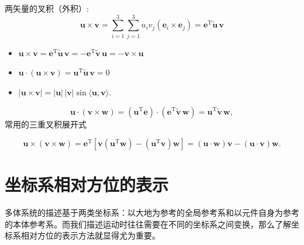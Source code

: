 \begin{definition}[向量的叉积]
	两矢量的叉积（外积）:
	$$
	\boldsymbol{u}\times\boldsymbol{v}
	= \sum_{i=1}^{3}\sum_{j=1}^{3} u_i v_j \left(\mathbf{e}_i\times\mathbf{e}_j\right)
	= \boldsymbol{e}^{\mathrm{T}}\tilde{\boldsymbol{u}}\,\boldsymbol{v}
	$$
\end{definition}

\begin{property}[向量叉积的性质]
	\begin{itemize}
		\item $\boldsymbol{u}\times\boldsymbol{v} = \boldsymbol{e}^{\mathrm{T}}\tilde{\boldsymbol{u}}\,\boldsymbol{v} = -\boldsymbol{e}^{\mathrm{T}}\tilde{\boldsymbol{v}}\,\boldsymbol{u} = -\boldsymbol{v}\times\boldsymbol{u}$
		\item$\boldsymbol{u}\cdot\left(\boldsymbol{u}\times\boldsymbol{v}\right) = \boldsymbol{u}^{\mathrm{T}}\tilde{\boldsymbol{u}}\,\boldsymbol{v} = 0$
		\item $|\boldsymbol{u}\times\boldsymbol{v}| = |\boldsymbol{u}|\,|\boldsymbol{v}|\sin\langle\boldsymbol{u},\boldsymbol{v}\rangle.$
	\end{itemize}
\end{property}

\begin{definition}[三矢量混合积运算]
	$$
	\boldsymbol{u}\cdot\left(\boldsymbol{v}\times\boldsymbol{w}\right)
	= \left(\boldsymbol{u}^{\mathrm{T}}\boldsymbol{e}\right)\cdot\left(\boldsymbol{e}^{\mathrm{T}}\tilde{\boldsymbol{v}}\,\boldsymbol{w}\right)
	= \boldsymbol{u}^{\mathrm{T}}\tilde{\boldsymbol{v}}\,\boldsymbol{w},
	$$
	常用的三重叉积展开式
	
	$$
	\boldsymbol{u}\times\left(\boldsymbol{v}\times\boldsymbol{w}\right)
	= \boldsymbol{e}^{\mathrm{T}}\left[\boldsymbol{v}\left(\boldsymbol{u}^{\mathrm{T}}\boldsymbol{w}\right) - \left(\boldsymbol{u}^{\mathrm{T}}\boldsymbol{v}\right)\boldsymbol{w}\right]
	= \left(\boldsymbol{u}\cdot\boldsymbol{w}\right)\boldsymbol{v} - \left(\boldsymbol{u}\cdot\boldsymbol{v}\right)\boldsymbol{w}.
	$$	
\end{definition}

\section{坐标系相对方位的表示}
多体系统的描述基于两类坐标系：以大地为参考的全局参考系和以元件自身为参考的本体参考系。而我们描述运动时往往需要在不同的坐标系之间变换，那么了解坐标系相对方位的表示方法就显得尤为重要。

